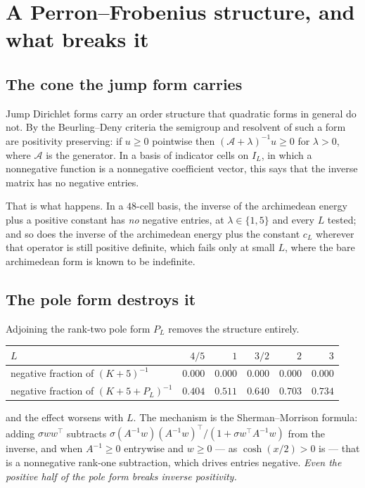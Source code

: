 \section{A Perron--Frobenius structure, and what breaks it}\label{sec:cone}
\subsection{The cone the jump form carries}
Jump Dirichlet forms carry an order structure that quadratic forms in general do
not. By the Beurling--Deny criteria the semigroup and resolvent of such a form
are positivity preserving: if $u\geq0$ pointwise then $(\mathcal A+\lambda)^{-1}u\geq0$
for $\lambda>0$, where $\mathcal A$ is the generator. In a basis of indicator
cells on $I_L$, in which a nonnegative function is a nonnegative coefficient
vector, this says that the inverse matrix has no negative entries.

That is what happens. In a $48$-cell basis, the inverse of the archimedean
energy plus a positive constant has \emph{no} negative entries, at
$\lambda\in\{1,5\}$ and every $L$ tested; and so does the inverse of the
archimedean energy plus the constant $c_L$ wherever that operator is still
positive definite, which fails only at small $L$, where the bare archimedean form
is known to be indefinite.

\subsection{The pole form destroys it}
Adjoining the rank-two pole form $P_L$ removes the structure entirely.
\begin{center}
\small
\begin{tabular}{lrrrrr}
\toprule
$L$ & $4/5$ & $1$ & $3/2$ & $2$ & $3$\\
\midrule
negative fraction of $(K+5)^{-1}$
 & $0.000$ & $0.000$ & $0.000$ & $0.000$ & $0.000$\\
negative fraction of $(K+5+P_L)^{-1}$
 & $0.404$ & $0.511$ & $0.640$ & $0.703$ & $0.734$\\
\bottomrule
\end{tabular}
\end{center}
and the effect worsens with $L$. The mechanism is the Sherman--Morrison formula:
adding $\sigma ww^{\!\top}$ subtracts
$\sigma(A^{-1}w)(A^{-1}w)^{\!\top}/(1+\sigma w^{\!\top}A^{-1}w)$ from the
inverse, and when $A^{-1}\geq0$ entrywise and $w\geq0$ --- as $\cosh(x/2)>0$ is
--- that is a nonnegative rank-one subtraction, which drives entries negative.
\emph{Even the positive half of the pole form breaks inverse positivity.}

